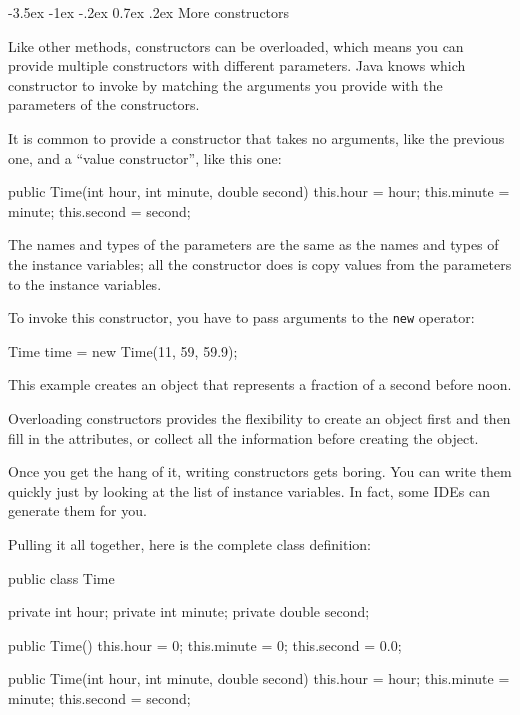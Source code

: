 \documentclass[12pt]{book}
\makeatletter
\theoremstyle{exercise}
\newcommand{\java}[1]{\verb"#1"}
\renewcommand{\section}{\@startsection{section}{1}{\z@}%
    {-3.5ex \@plus -1ex \@minus -.2ex}%
    {0.7ex \@plus.2ex}%
    {\normalfont\Large\bfseries}}
\newcommand{\java}[1]{\lstinline{#1}} %
\makeatother
\begin{document}
\section{More constructors}


Like other methods, constructors can be overloaded, which means you can provide multiple constructors with different parameters.
Java knows which constructor to invoke by matching the arguments you provide with the parameters of the constructors.



It is common to provide a constructor that takes no arguments, like the previous one, and a ``value constructor'', like this one:

\begin{code}
    public Time(int hour, int minute, double second) {
        this.hour = hour;
        this.minute = minute;
        this.second = second;
    }
\end{code}

The names and types of the parameters are the same as the names and types of the instance variables; all the constructor does is copy values from the parameters to the instance variables.

To invoke this constructor, you have to pass arguments to the \java{new} operator:

\begin{code}
    Time time = new Time(11, 59, 59.9);
\end{code}

This example creates an object that represents a fraction of a second before noon.

Overloading constructors provides the flexibility to create an object first and then fill in the attributes, or collect all the information before creating the object.

Once you get the hang of it, writing constructors gets boring.
You can write them quickly just by looking at the list of instance variables.
In fact, some IDEs can generate them for you.

Pulling it all together, here is the complete class definition:

\begin{code}
public class Time {
    private int hour;
    private int minute;
    private double second;

    public Time() {
        this.hour = 0;
        this.minute = 0;
        this.second = 0.0;
    }

    public Time(int hour, int minute, double second) {
        this.hour = hour;
        this.minute = minute;
        this.second = second;
    }
}
\end{code}
\end{document}
